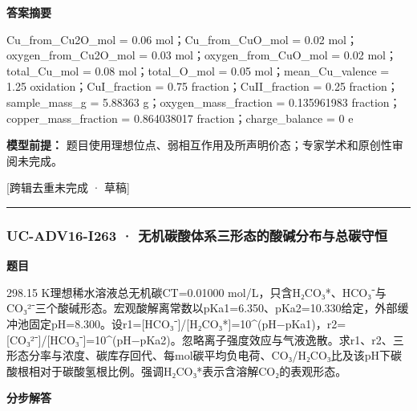 \documentclass[UTF8,11pt,a4paper]{ctexart}
\begin{document}
\noindent\textbf{答案摘要}\par
Cu\_from\_Cu2O\_mol = 0.06 mol；Cu\_from\_CuO\_mol = 0.02 mol；oxygen\_from\_Cu2O\_mol = 0.03 mol；oxygen\_from\_CuO\_mol = 0.02 mol；total\_Cu\_mol = 0.08 mol；total\_O\_mol = 0.05 mol；mean\_Cu\_valence = 1.25 oxidation；CuI\_fraction = 0.75 fraction；CuII\_fraction = 0.25 fraction；sample\_mass\_g = 5.88363 g；oxygen\_mass\_fraction = 0.135961983 fraction；copper\_mass\_fraction = 0.864038017 fraction；charge\_balance = 0 e\par
\noindent\textbf{模型前提：}
题目使用理想位点、弱相互作用及所声明价态；专家学术和原创性审阅未完成。\par
\noindent\textcolor{red!65!black}{[跨辑去重未完成 · 草稿]} \par
\medskip\hrule\medskip
{}
\subsubsection*{UC-ADV16-I263 · 无机碳酸体系三形态的酸碱分布与总碳守恒}
\noindent\textbf{题目}\par
298.15 K理想稀水溶液总无机碳CT=0.01000 mol/L，只含H₂CO₃*、HCO₃⁻与CO₃²⁻三个酸碱形态。宏观酸解离常数以pKa1=6.350、pKa2=10.330给定，外部缓冲池固定pH=8.300。设r1=[HCO₃⁻]/[H₂CO₃*]=10\textasciicircum{}(pH−pKa1)，r2=[CO₃²⁻]/[HCO₃⁻]=10\textasciicircum{}(pH−pKa2)。忽略离子强度效应与气液逸散。求r1、r2、三形态分率与浓度、碳库存回代、每mol碳平均负电荷、CO₃/H₂CO₃比及该pH下碳酸根相对于碳酸氢根比例。强调H₂CO₃*表示含溶解CO₂的表观形态。\par
\medskip\noindent\textbf{分步解答}
\end{document}
